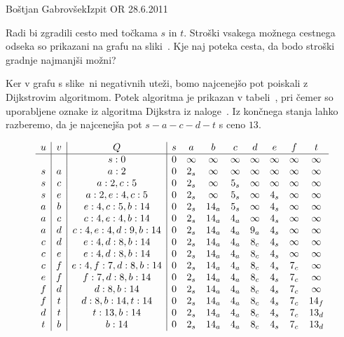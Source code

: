 \begin{naloga}{Boštjan Gabrovšek}{Izpit OR 28.6.2011}
\begin{vprasanje}
Radi bi zgradili cesto med točkama $s$ in $t$.
Stroški vsakega možnega cestnega odseka
so prikazani na grafu na sliki~\fig.
Kje naj poteka cesta, da bodo stroški gradnje najmanjši možni?

\begin{slika}
\pgfslika
{}
\end{slika}
\end{vprasanje}

\begin{odgovor}
Ker v grafu s slike~\fig ni negativnih uteži,
bomo najcenejšo pot poiskali z Dijkstrovim algoritmom.
Potek algoritma je prikazan v tabeli~\fig,
pri čemer so uporabljene oznake
iz algoritma {\sc Dijkstra} iz naloge~\res[dijkstra].
Iz končnega stanja lahko razberemo,
da je najcenejša pot $s - a - c - d - t$ s ceno $13$.
%
\begin{tabela}
$$
\begin{array}{c|c|c|cccccccc}
u & v & Q & s & a & b & c & d & e & f & t \\ \hline
  &   & s: 0 & 0 & \infty & \infty & \infty & \infty & \infty & \infty & \infty \\
s & a & a: 2 & 0 & 2_s & \infty & \infty & \infty & \infty & \infty & \infty \\
s & c & a: 2, c: 5 & 0 & 2_s & \infty & 5_s & \infty & \infty & \infty & \infty \\
s & e & a: 2, e: 4, c: 5 & 0 & 2_s & \infty & 5_s & \infty & 4_s & \infty & \infty \\
a & b & e: 4, c: 5, b: 14 & 0 & 2_s & 14_a & 5_s & \infty & 4_s & \infty & \infty \\
a & c & c: 4, e: 4, b: 14 & 0 & 2_s & 14_a & 4_a & \infty & 4_s & \infty & \infty \\
a & d & c: 4, e: 4, d: 9, b: 14 & 0 & 2_s & 14_a & 4_a & 9_a & 4_s & \infty & \infty \\
c & d & e: 4, d: 8, b: 14 & 0 & 2_s & 14_a & 4_a & 8_c & 4_s & \infty & \infty \\
c & e & e: 4, d: 8, b: 14 & 0 & 2_s & 14_a & 4_a & 8_c & 4_s & \infty & \infty \\
c & f & e: 4, f: 7, d: 8, b: 14 & 0 & 2_s & 14_a & 4_a & 8_c & 4_s & 7_c & \infty \\
e & f & f: 7, d: 8, b: 14 & 0 & 2_s & 14_a & 4_a & 8_c & 4_s & 7_c & \infty \\
f & d & d: 8, b: 14 & 0 & 2_s & 14_a & 4_a & 8_c & 4_s & 7_c & \infty \\
f & t & d: 8, b: 14, t: 14 & 0 & 2_s & 14_a & 4_a & 8_c & 4_s & 7_c & 14_f \\
d & t & t: 13, b: 14 & 0 & 2_s & 14_a & 4_a & 8_c & 4_s & 7_c & 13_d \\
t & b & b: 14 & 0 & 2_s & 14_a & 4_a & 8_c & 4_s & 7_c & 13_d \\
\end{array}
$$
\end{tabela}
\end{odgovor}
\end{naloga}
